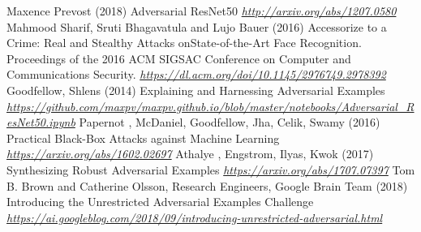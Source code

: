 \begin{vbframe}
{\begin{thebibliography}{99}
 Maxence Prevost (2018)
\newblock Adversarial ResNet50 
\newblock \emph{\url{http://arxiv.org/abs/1207.0580}}
 Mahmood Sharif, Sruti  Bhagavatula and Lujo Bauer (2016)
\newblock Accessorize to a Crime: Real and Stealthy Attacks onState-of-the-Art Face Recognition. Proceedings of the 2016 ACM SIGSAC Conference on Computer and Communications Security.
\newblock \emph{\url{https://dl.acm.org/doi/10.1145/2976749.2978392}}
 Goodfellow, Shlens (2014)
\newblock Explaining and Harnessing Adversarial Examples
\newblock \emph{\url{https://github.com/maxpv/maxpv.github.io/blob/master/notebooks/Adversarial_ResNet50.ipynb}}
 Papernot , McDaniel, Goodfellow, Jha, Celik, Swamy (2016)
\newblock Practical Black-Box Attacks against Machine Learning
\newblock \emph{\url{https://arxiv.org/abs/1602.02697}}
 Athalye , Engstrom, Ilyas, Kwok (2017)
\newblock Synthesizing Robust Adversarial Examples
\newblock \emph{\url{https://arxiv.org/abs/1707.07397}}
 Tom B. Brown and Catherine Olsson, Research Engineers, Google Brain Team (2018)
\newblock 
Introducing the Unrestricted Adversarial Examples Challenge 
\newblock \emph{\url{https://ai.googleblog.com/2018/09/introducing-unrestricted-adversarial.html}}
\end{thebibliography}
}
\end{vbframe}
\endlecture

